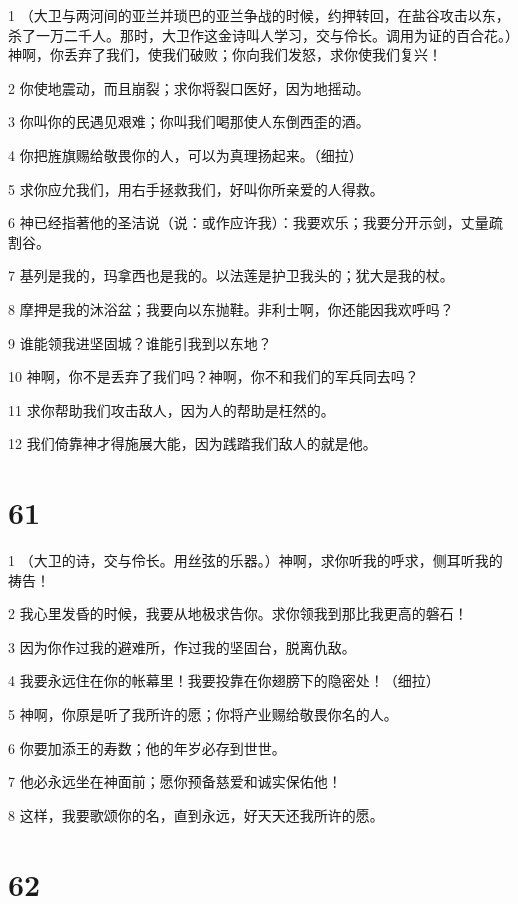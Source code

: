\par 1 （大卫与两河间的亚兰并琐巴的亚兰争战的时候，约押转回，在盐谷攻击以东，杀了一万二千人。那时，大卫作这金诗叫人学习，交与伶长。调用为证的百合花。）神啊，你丢弃了我们，使我们破败；你向我们发怒，求你使我们复兴！
\par 2 你使地震动，而且崩裂；求你将裂口医好，因为地摇动。
\par 3 你叫你的民遇见艰难；你叫我们喝那使人东倒西歪的酒。
\par 4 你把旌旗赐给敬畏你的人，可以为真理扬起来。（细拉）
\par 5 求你应允我们，用右手拯救我们，好叫你所亲爱的人得救。
\par 6 神已经指著他的圣洁说（说：或作应许我）：我要欢乐；我要分开示剑，丈量疏割谷。
\par 7 基列是我的，玛拿西也是我的。以法莲是护卫我头的；犹大是我的杖。
\par 8 摩押是我的沐浴盆；我要向以东抛鞋。非利士啊，你还能因我欢呼吗？
\par 9 谁能领我进坚固城？谁能引我到以东地？
\par 10 神啊，你不是丢弃了我们吗？神啊，你不和我们的军兵同去吗？
\par 11 求你帮助我们攻击敌人，因为人的帮助是枉然的。
\par 12 我们倚靠神才得施展大能，因为践踏我们敌人的就是他。

\chapter{61}

\par 1 （大卫的诗，交与伶长。用丝弦的乐器。）神啊，求你听我的呼求，侧耳听我的祷告！
\par 2 我心里发昏的时候，我要从地极求告你。求你领我到那比我更高的磐石！
\par 3 因为你作过我的避难所，作过我的坚固台，脱离仇敌。
\par 4 我要永远住在你的帐幕里！我要投靠在你翅膀下的隐密处！（细拉）
\par 5 神啊，你原是听了我所许的愿；你将产业赐给敬畏你名的人。
\par 6 你要加添王的寿数；他的年岁必存到世世。
\par 7 他必永远坐在神面前；愿你预备慈爱和诚实保佑他！
\par 8 这样，我要歌颂你的名，直到永远，好天天还我所许的愿。

\chapter{62}

